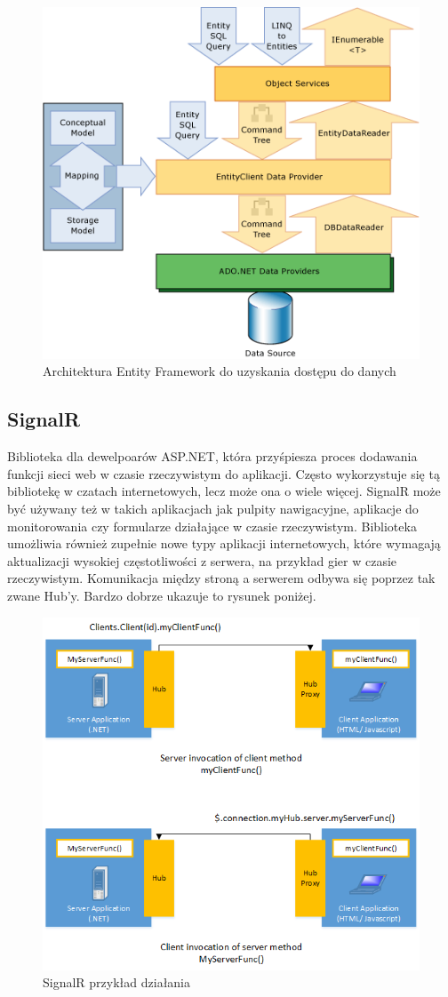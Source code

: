 \documentclass[12pt,a4paper]{article}
\begin{document}
\begin{figure}[h]
	\centering
	\includegraphics[width=0.7\linewidth]{entity}
	\caption{Architektura Entity Framework do uzyskania dostępu do danych}
	\label{fig:entity}
\end{figure}


\subsection{SignalR} 			%

\hspace*{0.7cm} Biblioteka dla dewelpoarów ASP.NET, która przyśpiesza proces dodawania funkcji sieci web w czasie rzeczywistym do aplikacji. Często wykorzystuje się tą bibliotekę w czatach internetowych, lecz może ona o wiele więcej. SignalR może być używany też w takich aplikacjach jak pulpity nawigacyjne, aplikacje do monitorowania czy formularze działające w czasie rzeczywistym. Biblioteka umożliwia również zupełnie nowe typy aplikacji internetowych, które wymagają aktualizacji wysokiej częstotliwości z serwera, na przykład gier w czasie rzeczywistym.
Komunikacja między stroną a serwerem odbywa się poprzez tak zwane Hub'y. Bardzo dobrze ukazuje to rysunek poniżej. \newline

\begin{figure}[h]
	\centering
	\includegraphics[width=0.7\linewidth]{signalr}
	\caption{SignalR przykład działania}
	\label{fig:signalr}
\end{figure}
\end{document}
